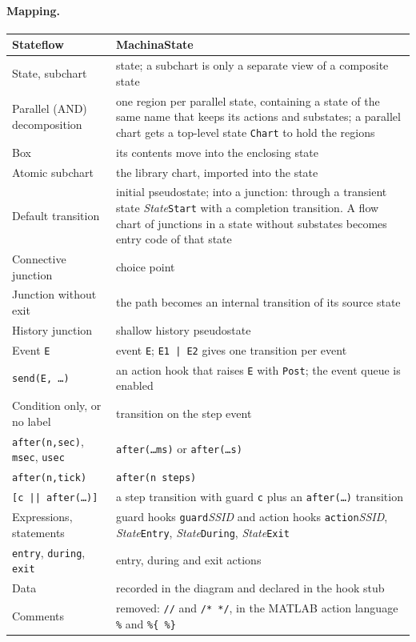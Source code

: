 \documentclass[11pt,a4paper,openany]{report}
\newcommand{\code}[1]{\texttt{#1}}
\begin{document}
\paragraph{Mapping.}
\begin{center}
\small
\begin{tabularx}{\linewidth}{@{}lX@{}}
\toprule
\textbf{Stateflow} & \textbf{MachinaState} \\
\midrule
State, subchart              & state; a subchart is only a separate view of a composite state \\
Parallel (AND) decomposition & one region per parallel state, containing a state of the same name that keeps its actions and substates; a parallel chart gets a top-level state \code{Chart} to hold the regions \\
Box                          & its contents move into the enclosing state \\
Atomic subchart              & the library chart, imported into the state \\
Default transition           & initial pseudostate; into a junction: through a transient state \textit{State}\code{Start} with a completion transition. A flow chart of junctions in a state without substates becomes entry code of that state \\
Connective junction          & choice point \\
Junction without exit        & the path becomes an internal transition of its source state \\
History junction             & shallow history pseudostate \\
Event \code{E}               & event \code{E}; \code{E1 | E2} gives one transition per event \\
\code{send(E, \dots)}         & an action hook that raises \code{E} with \code{Post}; the event queue is enabled \\
Condition only, or no label  & transition on the step event \\
\code{after(n,sec)}, \code{msec}, \code{usec} & \code{after(\dots ms)} or \code{after(\dots s)} \\
\code{after(n,tick)}         & \code{after(n steps)} \\
\code{[c || after(\dots)]}   & a step transition with guard \code{c} plus an \code{after(\dots)} transition \\
Expressions, statements      & guard hooks \code{guard}\textit{SSID} and action hooks \code{action}\textit{SSID}, \textit{State}\code{Entry}, \textit{State}\code{During}, \textit{State}\code{Exit} \\
\code{entry}, \code{during}, \code{exit} & entry, during and exit actions \\
Data                         & recorded in the diagram and declared in the hook stub \\
Comments                     & removed: \code{//} and \code{/* */}, in the MATLAB action language \code{\%} and \code{\%\{ \%\}} \\
\bottomrule
\end{tabularx}
\end{center}
\end{document}
